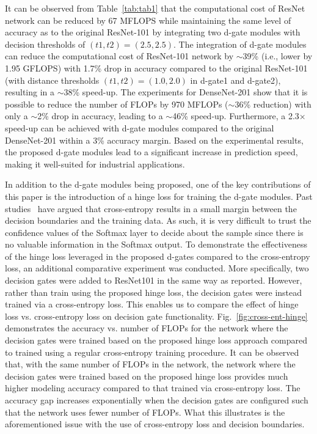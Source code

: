 \documentclass{article}
\begin{document}
It can be observed from Table~\ref{tab:tab1} that the computational cost of ResNet network can be reduced by 67 MFLOPS while maintaining the same level of accuracy as to the original ResNet-101 by integrating two d-gate modules with decision thresholds of $(t1,t2)=(2.5,2.5)$. The integration of d-gate modules can reduce the computational cost of ResNet-101 network by $\sim$39\% (i.e., lower by 1.95 GFLOPS) with 1.7\% drop in accuracy compared to the original ResNet-101 (with distance thresholds $(t1,t2)=(1.0,2.0)$ in d-gate1 and d-gate2), resulting in a $\sim$38\% speed-up. The experiments for DenseNet-201 show that it is possible to reduce the number of FLOPs by 970 MFLOPs ($\sim$36\% reduction) with only a $\sim$2\% drop in accuracy, leading to a $\sim$46\% speed-up. Furthermore, a \mbox{2.3$\times$} speed-up can be achieved with d-gate modules compared to the original DenseNet-201 within a 3\% accuracy margin. Based on the experimental results, the proposed d-gate modules lead to a significant increase in prediction speed, making it well-suited for industrial applications.

In addition to the d-gate modules being proposed, one of the key contributions of this paper is the introduction of a hinge loss for training the d-gate modules.  Past studies~\cite{liang2017soft} have argued that cross-entropy results in a small margin between the decision boundaries and the training data.  As such, it is very difficult to trust the confidence values of the Softmax layer to decide about the sample since there is no valuable information in the Softmax output. To demonstrate the effectiveness of the hinge loss leveraged in the proposed d-gates compared to the cross-entropy loss, an additional comparative experiment was conducted.  More specifically, two decision gates were added to ResNet101 in the same way as reported. However, rather than train using the proposed hinge loss, the decision gates were instead trained via a cross-entropy loss.  This enables us to compare the effect of hinge loss vs. cross-entropy loss on decision gate functionality. Fig.~\ref{fig:cross-ent-hinge} demonstrates the accuracy vs. number of FLOPs for the network where the decision gates were trained based on the proposed hinge loss approach compared to trained using a regular cross-entropy training procedure.  It can be observed that, with the same number of FLOPs in the network, the network where the decision gates were trained based on the proposed hinge loss provides much higher modeling accuracy compared to that trained via cross-entropy loss.
The accuracy gap increases exponentially when the decision gates are configured such that the network uses fewer number of FLOPs.  What this illustrates is the aforementioned issue with the use of cross-entropy loss and decision boundaries.


{\small


}
\end{document}

